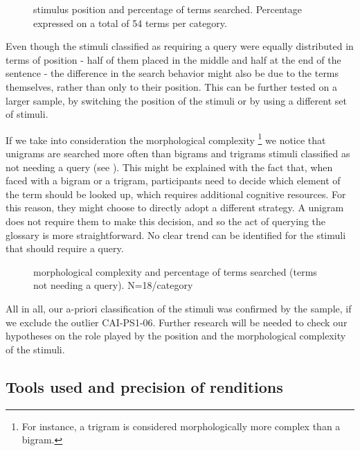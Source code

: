 \documentclass[output=paper]{langsci/langscibook}
\begin{document}
\begin{stylecaption}\begin{figure}
\caption{stimulus position and percentage of terms searched. Percentage expressed on a total of 54 terms per category.}
\label{fig:key:10}
\end{figure}\end{stylecaption}

Even though the stimuli classified as requiring a query were equally distributed in terms of position - half of them placed in the middle and half at the end of the sentence - the difference in the search behavior might also be due to the terms themselves, rather than only to their position. This can be further tested on a larger sample, by switching the position of the stimuli or by using a different set of stimuli.

If we take into consideration the morphological complexity\textstyleannotationreference{ -} \footnote{For instance, a trigram is considered morphologically more complex than a bigram.}\textstyleannotationreference{ -} we notice that unigrams are searched more often than bigrams and trigrams  stimuli classified as not needing a query (see ). This might be explained with the fact that, when faced with a bigram or a trigram, participants need to decide which element of the term should be looked up, which requires additional cognitive resources. For this reason, they might choose to directly adopt a different strategy. A unigram does not require them to make this decision, and so the act of querying the glossary is more straightforward. No clear trend can be identified for the stimuli that should require a query.

\begin{stylecaption}\begin{figure}
\caption{morphological complexity and percentage of terms searched (terms not needing a query). N=18/category}
\label{fig:key:11}
\end{figure}\end{stylecaption}

All in all, our a-priori classification of the stimuli was confirmed by the sample, if we exclude the outlier CAI-PS1-06. Further research will be needed to check our hypotheses on the role played by the position and the morphological complexity of the stimuli.

\subsection{Tools used and precision of renditions}
\end{document}
